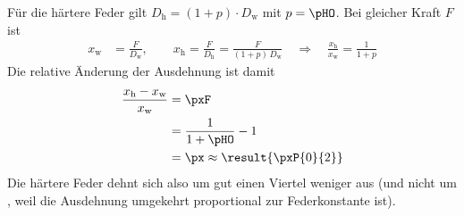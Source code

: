 Für die härtere Feder gilt $D_\text{h} = (1+p)\cdot D_\text{w}$ mit $p = \pHO$. Bei gleicher Kraft $F$ ist
\begin{align}
 x_\text{w} &= \frac{F}{D_\text{w}}, \qquad x_\text{h} = \frac{F}{D_\text{h}} = \frac{F}{(1+p)\,D_\text{w}}
 \quad\Rightarrow\quad \frac{x_\text{h}}{x_\text{w}} = \frac{1}{1+p}
\end{align}
Die relative Änderung der Ausdehnung ist damit
\begin{align}
 \frac{x_\text{h}-x_\text{w}}{x_\text{w}} &= \pxF \\
   &= \frac{1}{1+\pHO}-1 \\
   &= \px \approx \result{\pxP{0}{2}}
\end{align}
Die härtere Feder dehnt sich also um gut einen Viertel weniger aus (und nicht um \pHO, weil die Ausdehnung umgekehrt proportional zur Federkonstante ist).

